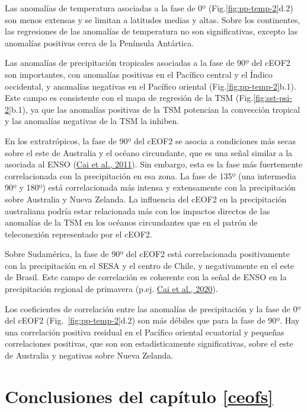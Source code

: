 \documentclass[12pt,oneside,a4paper]{reedthesis}
\begin{document}
Las anomalías de temperatura asociadas a la fase de 0º (Fig.\ref{fig:pp-temp-2}d.2) son menos extensas y se limitan a latitudes medias y altas.
Sobre los continentes, las regresiones de las anomalías de temperatura no son significativas, excepto las anomalías positivas cerca de la Península Antártica.

Las anomalías de precipitación tropicales asociadas a la fase de 90º del cEOF2 son importantes, con anomalías positivas en el Pacífico central y el Índico occidental, y anomalías negativas en el Pacífico oriental (Fig.\ref{fig:pp-temp-2}b.1).
Este campo es consistente con el mapa de regresión de la TSM (Fig.\ref{fig:sst-psi-2}b.1), ya que las anomalías positivas de la TSM potencian la convección tropical y las anomalías negativas de la TSM la inhiben.

En los extratrópicos, la fase de 90º del cEOF2 se asocia a condiciones más secas sobre el este de Australia y el océano circundante, que es una señal similar a la asociada al ENSO (\protect\hyperlink{ref-cai2011}{Cai et al., 2011}).
Sin embargo, esta es la fase más fuertemente correlacionada con la precipitación en esa zona.
La fase de 135º (una intermedia 90º y 180º) está correlacionada más intensa y extensamente con la precipitación sobre Australia y Nueva Zelanda.
La influencia del cEOF2 en la precipitación australiana podría estar relacionada más con los impactos directos de las anomalías de la TSM en los océanos circundantes que en el patrón de teleconexión representado por el cEOF2.

Sobre Sudamérica, la fase de 90º del cEOF2 está correlacionada positivamente con la precipitación en el SESA y el centro de Chile, y negativamente en el este de Brasil.
Este campo de correlación es coherente con la señal de ENSO en la precipitación regional de primavera (p.ej. \protect\hyperlink{ref-cai2020a}{Cai et al., 2020}).

Los coeficientes de correlación entre las anomalías de precipitación y la fase de 0º del cEOF2 (Fig.~\ref{fig:pp-temp-2}d.2) son más débiles que para la fase de 90º.
Hay una correlación positiva residual en el Pacífico oriental ecuatorial y pequeñas correlaciones positivas, que son son estadísticamente significativas, sobre el este de Australia y negativas sobre Nueva Zelanda.

\hypertarget{conclusiones-del-capuxedtulo-refceofs}{%
\section{Conclusiones del capítulo \ref{ceofs}}\label{conclusiones-del-capuxedtulo-refceofs}}
\end{document}
